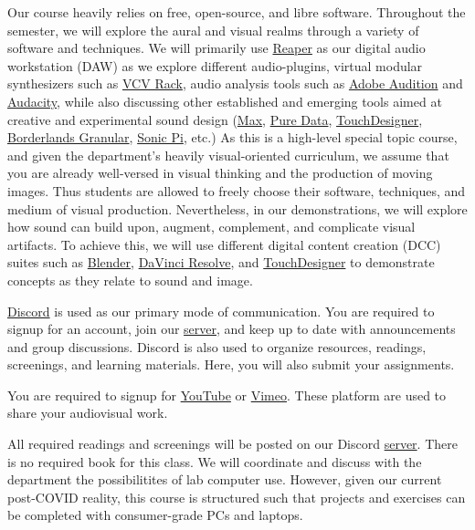 Our course heavily relies on free, open-source, and libre software. Throughout the semester, we will explore the aural and visual realms through a variety of software and techniques. We will primarily use \href{https://www.reaper.fm/}{Reaper} as our digital audio workstation (DAW) as we explore different audio-plugins, virtual modular synthesizers such as \href{https://vcvrack.com/Rack}{VCV Rack}, audio analysis tools such as \href{https://www.adobe.com/products/audition.html}{Adobe Audition} and \href{https://www.audacityteam.org/}{Audacity}, while also discussing other established and emerging tools aimed at creative and experimental sound design (\href{https://cycling74.com/products/max}{Max}, \href{https://puredata.info/}{Pure Data}, \href{https://derivative.ca/}{TouchDesigner}, \href{http://www.borderlands-granular.com/app/}{Borderlands Granular}, \href{https://sonic-pi.net/}{Sonic Pi}, etc.) As this is a high-level special topic course, and given the department's heavily visual-oriented curriculum, we assume that you are already well-versed in visual thinking and the production of moving images. Thus students are allowed to freely choose their software, techniques, and medium of visual production. Nevertheless, in our demonstrations, we will explore how sound can build upon, augment, complement, and complicate visual artifacts. To achieve this, we will use different digital content creation (DCC) suites such as \href{http://blender.org/}{Blender}, \href{https://www.blackmagicdesign.com/products/davinciresolve/}{DaVinci Resolve}, and \href{https://derivative.ca/}{TouchDesigner} to demonstrate concepts as they relate to sound and image.


\href{http://discordapp.com/}{Discord} is used as our primary mode of communication. You are required to signup for an account, join our \href{\discordURL}{server}, and keep up to date with announcements and group discussions. Discord is also used to organize resources, readings, screenings, and learning materials. Here, you will also submit your assignments.

You are required to signup for \href{https://www.youtube.com/}{YouTube} or \href{https://vimeo.com/}{Vimeo}. These platform are used to share your audiovisual work.

All required readings and screenings will be posted on our Discord \href{\discordURL}{server}. There is no required book for this class. We will coordinate and discuss with the department the possibilitites of lab computer use. However, given our current post-COVID reality, this course is structured such that projects and exercises can be completed with consumer-grade PCs and laptops.